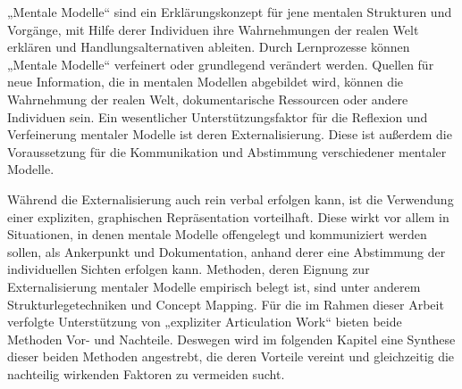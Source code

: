 „Mentale Modelle“ sind ein Erklärungskonzept für jene mentalen Strukturen und Vorgänge, mit Hilfe derer Individuen ihre Wahrnehmungen der realen Welt erklären und Handlungsalternativen ableiten. Durch Lernprozesse können „Mentale Modelle“ verfeinert oder grundlegend verändert werden. Quellen für neue Information, die in mentalen Modellen abgebildet wird, können die Wahrnehmung der realen Welt, dokumentarische Ressourcen oder andere Individuen sein. Ein wesentlicher Unterstützungsfaktor für die Reflexion und Verfeinerung mentaler Modelle ist deren Externalisierung. Diese ist außerdem die Voraussetzung für die Kommunikation und Abstimmung verschiedener mentaler Modelle.

Während die Externalisierung auch rein verbal erfolgen kann, ist die Verwendung einer expliziten, graphischen Repräsentation vorteilhaft. Diese wirkt vor allem in Situationen, in denen mentale Modelle offengelegt und kommuniziert werden sollen, als Ankerpunkt und Dokumentation, anhand derer eine Abstimmung der individuellen Sichten erfolgen kann. Methoden, deren Eignung zur Externalisierung mentaler Modelle empirisch belegt ist, sind unter anderem Strukturlegetechniken und Concept Mapping. Für die im Rahmen dieser Arbeit verfolgte Unterstützung von „expliziter Articulation Work“ bieten beide Methoden Vor- und Nachteile. Deswegen wird im folgenden Kapitel eine Synthese dieser beiden Methoden angestrebt, die deren Vorteile vereint und gleichzeitig die nachteilig wirkenden Faktoren zu vermeiden sucht.



